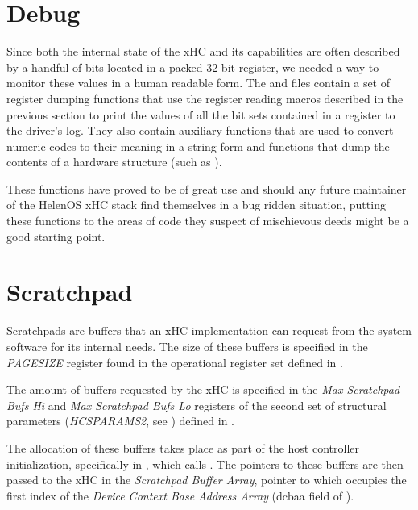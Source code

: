 
\section{Debug}

Since both the internal state of the xHC and its capabilities are often described by
a handful of bits located in a packed 32-bit register, we needed a way to monitor these
values in a human readable form. The  and
 files contain a set of register dumping
functions that use the register reading macros described in the previous section to print
the values of all the bit sets contained in a register to the driver's log. They also contain
auxiliary functions that are used to convert numeric codes to their meaning in a string form and
functions that dump the contents of a hardware structure (such as ).

These functions have proved to be of great use and should any future maintainer of the
HelenOS xHC stack find themselves in a bug ridden situation, putting these functions to
the areas of code they suspect of mischievous deeds might be a good starting point.



\section{Scratchpad}
\label{sec:scratchpads}

Scratchpads are buffers that an xHC implementation can request from the system software
for its internal needs. The size of these buffers is specified in the \textit{PAGESIZE} register
found in the operational register set defined in .

The amount of buffers requested by the xHC is specified in the \textit{Max Scratchpad Bufs Hi} and
\textit{Max Scratchpad Bufs Lo} registers of the second set of structural parameters (\textit{HCSPARAMS2},
see ) defined in .

The allocation of these buffers takes place as part of the host controller initialization,
specifically in , which calls . The pointers
to these buffers are then passed to the xHC in the \textit{Scratchpad Buffer Array}, pointer to which
occupies the first index of the \textit{Device Context Base Address Array} (dcbaa field of
).

